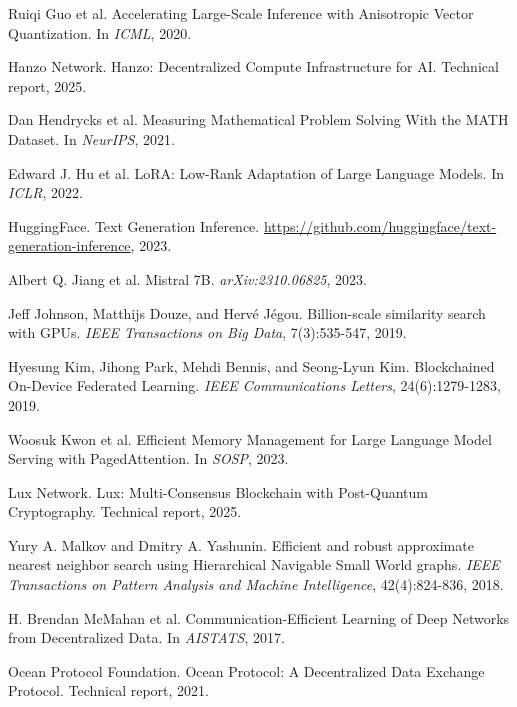 \documentclass[11pt,a4paper]{article}
\begin{document}
\begin{thebibliography}{99}
Ruiqi Guo et al.
\newblock Accelerating Large-Scale Inference with Anisotropic Vector Quantization.
\newblock In \textit{ICML}, 2020.

Hanzo Network.
\newblock Hanzo: Decentralized Compute Infrastructure for AI.
\newblock Technical report, 2025.

Dan Hendrycks et al.
\newblock Measuring Mathematical Problem Solving With the MATH Dataset.
\newblock In \textit{NeurIPS}, 2021.

Edward J. Hu et al.
\newblock LoRA: Low-Rank Adaptation of Large Language Models.
\newblock In \textit{ICLR}, 2022.

HuggingFace.
\newblock Text Generation Inference.
\newblock \url{https://github.com/huggingface/text-generation-inference}, 2023.

Albert Q. Jiang et al.
\newblock Mistral 7B.
\newblock \textit{arXiv:2310.06825}, 2023.

Jeff Johnson, Matthijs Douze, and Hervé Jégou.
\newblock Billion-scale similarity search with GPUs.
\newblock \textit{IEEE Transactions on Big Data}, 7(3):535-547, 2019.

Hyesung Kim, Jihong Park, Mehdi Bennis, and Seong-Lyun Kim.
\newblock Blockchained On-Device Federated Learning.
\newblock \textit{IEEE Communications Letters}, 24(6):1279-1283, 2019.

Woosuk Kwon et al.
\newblock Efficient Memory Management for Large Language Model Serving with PagedAttention.
\newblock In \textit{SOSP}, 2023.

Lux Network.
\newblock Lux: Multi-Consensus Blockchain with Post-Quantum Cryptography.
\newblock Technical report, 2025.

Yury A. Malkov and Dmitry A. Yashunin.
\newblock Efficient and robust approximate nearest neighbor search using Hierarchical Navigable Small World graphs.
\newblock \textit{IEEE Transactions on Pattern Analysis and Machine Intelligence}, 42(4):824-836, 2018.

H. Brendan McMahan et al.
\newblock Communication-Efficient Learning of Deep Networks from Decentralized Data.
\newblock In \textit{AISTATS}, 2017.

Ocean Protocol Foundation.
\newblock Ocean Protocol: A Decentralized Data Exchange Protocol.
\newblock Technical report, 2021.


\end{thebibliography}
\end{document}
